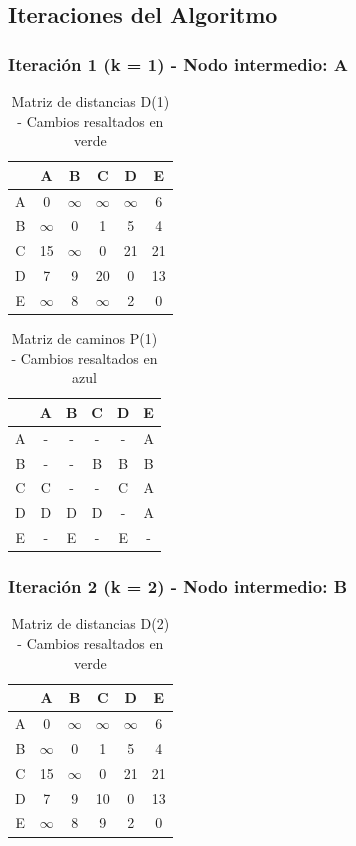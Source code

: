 \documentclass[12pt]{article}
\begin{document}
\clearpage
\subsection{Iteraciones del Algoritmo}
\subsubsection{Iteración 1 (k = 1) - Nodo intermedio: A}
\begin{table}[h!]
\centering
\begin{tabular}{|c|c|c|c|c|c|}
\hline
 & A & B & C & D & E \\\hline
A & 0 & $\infty$ & $\infty$ & $\infty$ & 6 \\\hline
B & $\infty$ & 0 & 1 & 5 & 4 \\\hline
C & 15 & $\infty$ & 0 & 21 & \cellcolor{lightgreen} 21 \\\hline
D & 7 & 9 & 20 & 0 & \cellcolor{lightgreen} 13 \\\hline
E & $\infty$ & 8 & $\infty$ & 2 & 0 \\\hline
\end{tabular}
\caption{Matriz de distancias D(1) - Cambios resaltados en verde}
\end{table}

\begin{table}[h!]
\centering
\begin{tabular}{|c|c|c|c|c|c|}
\hline
 & A & B & C & D & E \\\hline
A & - & - & - & - & A \\\hline
B & - & - & B & B & B \\\hline
C & C & - & - & C & \cellcolor{lightblue} A \\\hline
D & D & D & D & - & \cellcolor{lightblue} A \\\hline
E & - & E & - & E & - \\\hline
\end{tabular}
\caption{Matriz de caminos P(1) - Cambios resaltados en azul}
\end{table}

\subsubsection{Iteración 2 (k = 2) - Nodo intermedio: B}
\begin{table}[h!]
\centering
\begin{tabular}{|c|c|c|c|c|c|}
\hline
 & A & B & C & D & E \\\hline
A & 0 & $\infty$ & $\infty$ & $\infty$ & 6 \\\hline
B & $\infty$ & 0 & 1 & 5 & 4 \\\hline
C & 15 & $\infty$ & 0 & 21 & 21 \\\hline
D & 7 & 9 & \cellcolor{lightgreen} 10 & 0 & 13 \\\hline
E & $\infty$ & 8 & \cellcolor{lightgreen} 9 & 2 & 0 \\\hline
\end{tabular}
\caption{Matriz de distancias D(2) - Cambios resaltados en verde}
\end{table}
\end{document}
